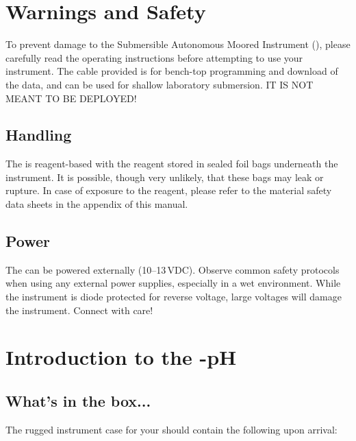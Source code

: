 \section{Warnings and Safety}

To prevent damage to the Submersible Autonomous Moored Instrument (\instType{}), please carefully read the operating instructions before attempting to use your instrument. The cable provided is for bench-top programming and download of the \instType{} data, and can be used for shallow laboratory submersion.  IT IS NOT MEANT TO BE DEPLOYED!


\subsection*{Handling}

The \instType{} is reagent-based with the reagent stored in sealed foil bags underneath the instrument.  It is possible, though very unlikely, that these bags may leak or rupture. In case of exposure to the reagent, please refer to the material safety data sheets in the appendix of this manual.


\subsection*{\instType{} Power}

The \instType{} can be powered externally (10--13\,VDC). Observe common safety protocols when using any external power supplies, especially in a wet environment.  While the instrument is diode protected for reverse voltage, large voltages will damage the instrument.  Connect with care!


\section{Introduction to the \instType{}-pH}

\subsection{What's in the box...}

The rugged instrument case for your \instType{} should contain the following upon arrival:

